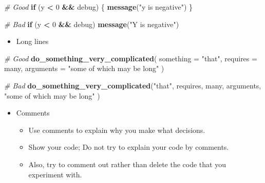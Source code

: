 \documentclass[
]{book}
\newenvironment{Shaded}{\begin{snugshade}}{\end{snugshade}}
\newcommand{\CommentTok}[1]{\textcolor[rgb]{0.56,0.35,0.01}{\textit{#1}}}
\newcommand{\ControlFlowTok}[1]{\textcolor[rgb]{0.13,0.29,0.53}{\textbf{#1}}}
\newcommand{\DataTypeTok}[1]{\textcolor[rgb]{0.13,0.29,0.53}{#1}}
\newcommand{\DecValTok}[1]{\textcolor[rgb]{0.00,0.00,0.81}{#1}}
\newcommand{\KeywordTok}[1]{\textcolor[rgb]{0.13,0.29,0.53}{\textbf{#1}}}
\newcommand{\NormalTok}[1]{#1}
\newcommand{\OperatorTok}[1]{\textcolor[rgb]{0.81,0.36,0.00}{\textbf{#1}}}
\newcommand{\StringTok}[1]{\textcolor[rgb]{0.31,0.60,0.02}{#1}}
\providecommand{\tightlist}{%
  \setlength{\itemsep}{0pt}\setlength{\parskip}{0pt}}
\begin{document}
\begin{Shaded}
\begin{Highlighting}[]
\CommentTok{\# Good}
\ControlFlowTok{if}\NormalTok{ (y }\OperatorTok{<}\StringTok{ }\DecValTok{0} \OperatorTok{\&\&}\StringTok{ }\NormalTok{debug) \{}
  \KeywordTok{message}\NormalTok{(}\StringTok{"y is negative"}\NormalTok{)}
\NormalTok{\}}

\CommentTok{\# Bad}
\ControlFlowTok{if}\NormalTok{ (y }\OperatorTok{<}\StringTok{ }\DecValTok{0} \OperatorTok{\&\&}\StringTok{ }\NormalTok{debug)}
\KeywordTok{message}\NormalTok{(}\StringTok{"Y is negative"}\NormalTok{)}
\end{Highlighting}
\end{Shaded}

\begin{itemize}
\tightlist
\item
  Long lines
\end{itemize}

\begin{Shaded}
\begin{Highlighting}[]
\CommentTok{\# Good}
\KeywordTok{do\_something\_very\_complicated}\NormalTok{(}
  \DataTypeTok{something =} \StringTok{"that"}\NormalTok{,}
  \DataTypeTok{requires =}\NormalTok{ many,}
  \DataTypeTok{arguments =} \StringTok{"some of which may be long"}
\NormalTok{)}

\CommentTok{\# Bad}
\KeywordTok{do\_something\_very\_complicated}\NormalTok{(}\StringTok{"that"}\NormalTok{, requires, many, arguments,}
                              \StringTok{"some of which may be long"}
\NormalTok{                              )}
\end{Highlighting}
\end{Shaded}

\begin{itemize}
\tightlist
\item
  Comments

  \begin{itemize}
  \tightlist
  \item
    Use comments to explain why you make what decisions.
  \item
    Show your code; Do not try to explain your code by comments.
  \item
    Also, try to comment out rather than delete the code that you experiment with.
  \end{itemize}
\end{itemize}

\begin{Shaded}
\end{Shaded}
\end{document}
